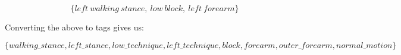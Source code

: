 \documentclass[10pt,twocolumn,a4paper]{article}
\begin{document}
  \[
    \{left \: walking \: stance, \: low \: block, \: left \: forearm\}
  \]

  Converting the above to tags gives us:

  \[
    \{walking\_stance, left\_stance, low\_technique, left\_technique,
    block, forearm, outer\_forearm, normal\_motion\}
  \]


 




















\end{document}
